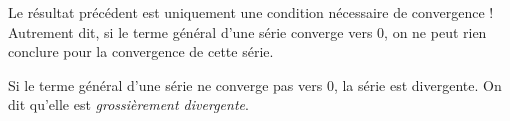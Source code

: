 \documentclass[french,11pt,twoside]{VcCours}
\newcommand{\Sum}[2]{\ensuremath{\textstyle{\sum\limits_{#1}^{#2}}}}
\begin{document}
\begin{Remarque}{}
	\warning{} Le résultat précédent est uniquement une condition nécessaire de convergence ! Autrement dit, si le terme général d'une série converge vers $0$, on ne peut rien conclure pour la convergence de cette série. 
\end{Remarque}

\begin{Corollaire}{}
Si le terme général d'une série ne converge pas vers $0$, la série est divergente. On dit qu'elle est \emph{grossièrement divergente}.
\end{Corollaire}

%
\end{document}
